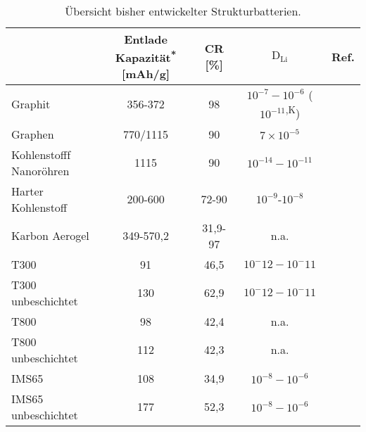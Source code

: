 \begin{table}[ht]
    \centering
    \caption{Übersicht bisher entwickelter Strukturbatterien.}
    \begin{tabular}[t]{lcccc}
    \toprule
    &Entlade Kapazität\textsuperscript{*} [mAh/g]
    &CR [\%] %
    &$\text{D}_{\text{Li}}$ %
    &Ref.\\
    \midrule
    Graphit
        &356-372
        &98
        &$10^{-7}-10^{-6}$ ($10^{-11}$\textsuperscript{,K})
        &\cite{Persson2010,Wang2021,Olutogun2024}\\
    Graphen
        &770/1115
        &90
        &$7 \times 10^{-5}$
        &\cite{Zhu2014,Wang2017,Kuehne2017}\\
    Kohlenstofff Nanoröhren
        &1115
        &90
        &$10^{-14}-10^{-11}$
        &\cite{Maurin1999,Zhao2000,Meunier2002,Shin2002,Nishidate2005,Schauerman2012}\\
    Harter Kohlenstoff
        &200-600 %
        &72-90 %
        &$10^{-9}$-$10^{-8}$
        &\cite{Fujimoto2010,Bridges2012,Yang2012}\\
    Karbon Aerogel
        &349-570,2
        &31,9-97%
        &n.a.
        &\cite{Yang2015,Pham2024,Li2022a}\\
    T300
        &91
        &46,5 %
        &$10^-12-10^-11$
        &\cite{Uchida1996,Kjell2011,Johansen2022}\\
    T300 unbeschichtet
        &130
        &62,9 %
        &$10^-12-10^-11$
        &\cite{Uchida1996,Kjell2011,Johansen2022}\\
    T800
        &98
        &42,4 %
        &n.a.
        &\cite{Kjell2011,Johansen2022,Johansen2024}\\
    T800 unbeschichtet
        &112
        &42,3 %
        &n.a.
        &\cite{Kjell2011,Johansen2022,Johansen2024}\\
    IMS65
        &108
        &34,9 %
        &$10^{-8}-10^{-6}$
        &\cite{Kjell2011}\\
    IMS65 unbeschichtet
        &177
        &52,3 %
        & $10^{-8}-10^{-6}$
        &\cite{Kjell2011,Kjell2013}\\
    \bottomrule
    \end{tabular}
\end{table}%